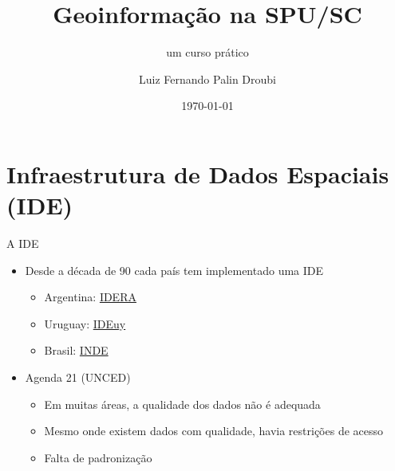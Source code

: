 \documentclass[9pt,ignorenonframetext,]{beamer}
\title[]{Geoinformação na SPU/SC}
\subtitle{um curso prático}
\author[
        Luiz Fernando Palin Droubi
    ]{Luiz Fernando Palin Droubi}
\institute[
    ]{
    Superintendência do Patrimônio da União em Santa Catarina
    }
\date[
      \today
  ]{
      \today
        }
\providecommand{\tightlist}{%
  \setlength{\itemsep}{0pt}\setlength{\parskip}{0pt}}
\begin{document}
  \begin{frame}[plain]
  \titlepage
  \end{frame}


  \begin{frame}
  \tableofcontents[hideallsubsections]
  \end{frame}

\hypertarget{infraestrutura-de-dados-espaciais-ide}{%
\section{Infraestrutura de Dados Espaciais
(IDE)}\label{infraestrutura-de-dados-espaciais-ide}}

\begin{frame}{A IDE}
\protect\hypertarget{a-ide}{}

\begin{itemize}[<+->]
\tightlist
\item
  Desde a década de 90 cada país tem implementado uma IDE

  \begin{itemize}[<+->]
  \tightlist
  \item
    Argentina: \href{https://www.idera.gob.ar/}{IDERA}
  \item
    Uruguay:
    \href{https://www.gub.uy/infraestructura-datos-espaciales/}{IDEuy}
  \item
    Brasil: \href{https://www.inde.gov.br/}{INDE}
  \end{itemize}
\item
  Agenda 21 (UNCED)

  \begin{itemize}[<+->]
  \tightlist
  \item
    Em muitas áreas, a qualidade dos dados não é adequada
  \item
    Mesmo onde existem dados com qualidade, havia restrições de acesso
  \item
    Falta de padronização
  \end{itemize}
\end{itemize}

\end{frame}
\end{document}
